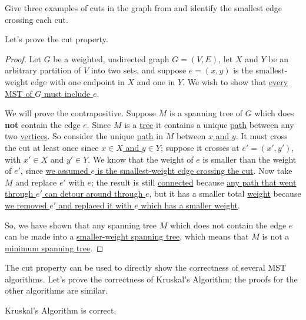 \documentclass{tufte-handout}
\begin{document}
\begin{questions}
\item Give three examples of cuts in the graph from
   and identify the smallest edge crossing
  each cut.
\end{questions}

Let's prove the cut property.

\newcommand{\filled}[1]{\underline{#1}}

\begin{proof}
  Let $G$ be a weighted, undirected graph $G = (V,E)$, let $X$ and $Y$
  be an arbitrary partition of $V$ into two sets, and suppose
  $e = (x,y)$ is the smallest-weight edge with one endpoint in $X$ and
  one in $Y$.  We wish to show that \filled{every MST of $G$ must
    include $e$}.

  We will prove the contrapositive. Suppose $M$ is a spanning tree of
  $G$ which does \textbf{not} contain the edge $e$.  Since $M$ is a
  \filled{tree} it contains a unique \filled{path} between any two
  \filled{vertices}. So consider the unique \filled{path} in $M$
  between \filled{$x$ and $y$}. It must cross the cut at least once
  since \filled{$x \in X$ and $y \in Y$}; suppose it crosses at
  $e' = (x',y')$, with $x' \in X$ and $y' \in Y$.  We know that the
  weight of $e$ is smaller than the weight of $e'$, since \filled{we
    assumed $e$ is the smallest-weight edge crossing the cut}. Now
  take $M$ and replace \filled{$e'$} with \filled{$e$}; the result is
  still \filled{connected} because \filled{any path that went through
    $e'$ can detour around through $e$}, but it has a smaller total
  \filled{weight} because \filled{we removed $e'$ and replaced it with
  $e$ which has a smaller weight}.

So, we have shown that any spanning tree $M$ which does not contain
the edge $e$ can be made into a \filled{smaller-weight spanning tree},
which means that $M$ is not a \filled{minimum spanning tree}.
\end{proof}

The cut property can be used to directly show the correctness of
several MST algorithms.  Let's prove the correctness of Kruskal's
Algorithm; the proofs for the other algorithms are similar.

\begin{thm}
  Kruskal's Algorithm is correct.
\end{thm}
\end{document}
